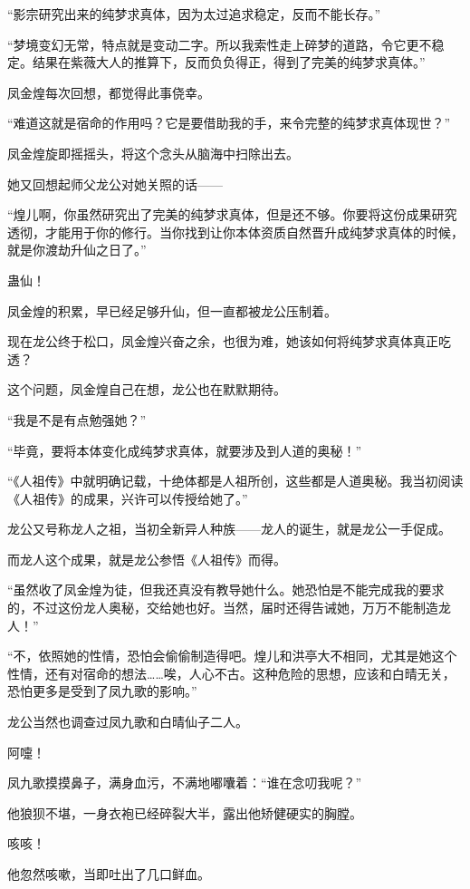 \begin{this_body}
“影宗研究出来的纯梦求真体，因为太过追求稳定，反而不能长存。”

“梦境变幻无常，特点就是变动二字。所以我索性走上碎梦的道路，令它更不稳定。结果在紫薇大人的推算下，反而负负得正，得到了完美的纯梦求真体。”

凤金煌每次回想，都觉得此事侥幸。

“难道这就是宿命的作用吗？它是要借助我的手，来令完整的纯梦求真体现世？”

凤金煌旋即摇摇头，将这个念头从脑海中扫除出去。

她又回想起师父龙公对她关照的话——

“煌儿啊，你虽然研究出了完美的纯梦求真体，但是还不够。你要将这份成果研究透彻，才能用于你的修行。当你找到让你本体资质自然晋升成纯梦求真体的时候，就是你渡劫升仙之日了。”

蛊仙！

凤金煌的积累，早已经足够升仙，但一直都被龙公压制着。

现在龙公终于松口，凤金煌兴奋之余，也很为难，她该如何将纯梦求真体真正吃透？

这个问题，凤金煌自己在想，龙公也在默默期待。

“我是不是有点勉强她？”

“毕竟，要将本体变化成纯梦求真体，就要涉及到人道的奥秘！”

“《人祖传》中就明确记载，十绝体都是人祖所创，这些都是人道奥秘。我当初阅读《人祖传》的成果，兴许可以传授给她了。”

龙公又号称龙人之祖，当初全新异人种族——龙人的诞生，就是龙公一手促成。

而龙人这个成果，就是龙公参悟《人祖传》而得。

“虽然收了凤金煌为徒，但我还真没有教导她什么。她恐怕是不能完成我的要求的，不过这份龙人奥秘，交给她也好。当然，届时还得告诫她，万万不能制造龙人！”

“不，依照她的性情，恐怕会偷偷制造得吧。煌儿和洪亭大不相同，尤其是她这个性情，还有对宿命的想法……唉，人心不古。这种危险的思想，应该和白晴无关，恐怕更多是受到了凤九歌的影响。”

龙公当然也调查过凤九歌和白晴仙子二人。

阿嚏！

凤九歌摸摸鼻子，满身血污，不满地嘟囔着：“谁在念叨我呢？”

他狼狈不堪，一身衣袍已经碎裂大半，露出他矫健硬实的胸膛。

咳咳！

他忽然咳嗽，当即吐出了几口鲜血。


\end{this_body}
